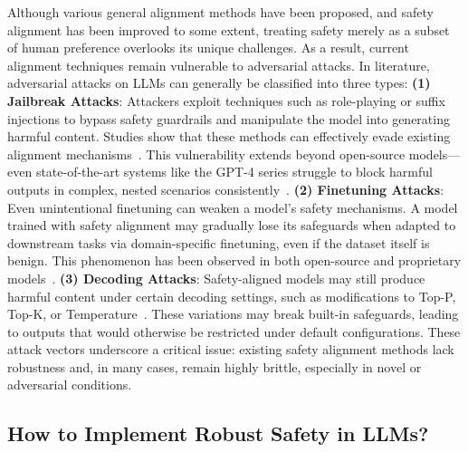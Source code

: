 Although various general alignment methods have been proposed, and safety alignment has been improved to some extent, treating safety merely as a subset of human preference overlooks its unique challenges. As a result, current alignment techniques remain vulnerable to adversarial attacks. In literature, adversarial attacks on LLMs can generally be classified into three types: 
\textbf{(1) Jailbreak Attacks}: Attackers exploit techniques such as role-playing or suffix injections to bypass safety guardrails and manipulate the model into generating harmful content. Studies show that these methods can effectively evade existing alignment mechanisms~\cite{zouuniversal}. This vulnerability extends beyond open-source models—even state-of-the-art systems like the GPT-4 series struggle to block harmful outputs in complex, nested scenarios consistently~\cite{li2023deepinception}. \textbf{(2) Finetuning Attacks}: Even unintentional finetuning can weaken a model’s safety mechanisms. A model trained with safety alignment may gradually lose its safeguards when adapted to downstream tasks via domain-specific finetuning, even if the dataset itself is benign. This phenomenon has been observed in both open-source and proprietary models~\cite{qi2023fine}. \textbf{(3) Decoding Attacks}: Safety-aligned models may still produce harmful content under certain decoding settings, such as modifications to Top-P, Top-K, or Temperature~\cite{huang2023catastrophic}. These variations may break built-in safeguards, leading to outputs that would otherwise be restricted under default configurations. These attack vectors underscore a critical issue: existing safety alignment methods lack robustness and, in many cases, remain highly brittle, especially in novel or adversarial conditions.  

\subsection{How to Implement Robust Safety in LLMs?} %

